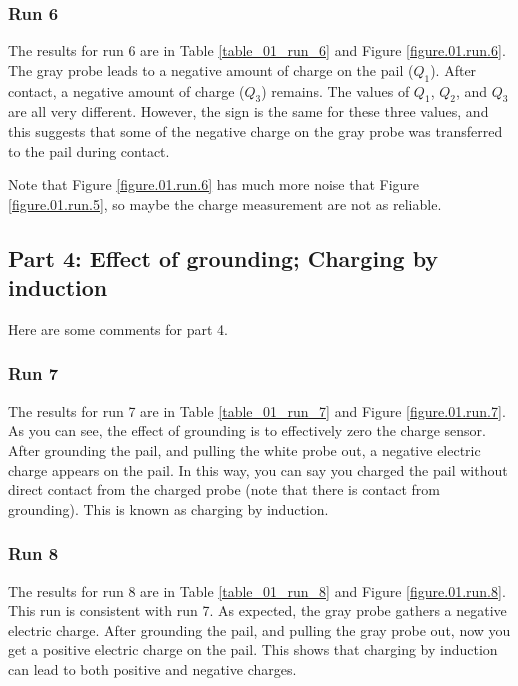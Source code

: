 \subsubsection{Run 6}
%
The results for run 6 are in Table \ref{table_01_run_6} and Figure \ref{figure.01.run.6}. The gray probe leads to a negative amount of charge on the pail ($Q_{1}$). After contact, a negative amount of charge ($Q_{3}$) remains. The values of $Q_{1}$, $Q_{2}$, and $Q_{3}$ are all very different. However, the sign is the same for these three values, and this suggests that some of the negative charge on the gray probe was transferred to the pail during contact.

Note that Figure \ref{figure.01.run.6} has much more noise that Figure \ref{figure.01.run.5}, so maybe the charge measurement are not as reliable.
%
\subsection{Part 4: Effect of grounding; Charging by induction}
%
Here are some comments for part 4.
%
\subsubsection{Run 7}
%
The results for run 7 are in Table \ref{table_01_run_7} and Figure \ref{figure.01.run.7}. As you can see, the effect of grounding is to effectively zero the charge sensor. After grounding the pail, and pulling the white probe out, a negative electric charge appears on the pail. In this way, you can say you charged the pail without direct contact from the charged probe (note that there is contact from grounding). This is known as charging by induction.
%
\subsubsection{Run 8}
%
The results for run 8 are in Table \ref{table_01_run_8} and Figure \ref{figure.01.run.8}. This run is consistent with run 7. As expected, the gray probe gathers a negative electric charge. After grounding the pail, and pulling the gray probe out, now you get a positive electric charge on the pail. This shows that charging by induction can lead to both positive and negative charges.
%
